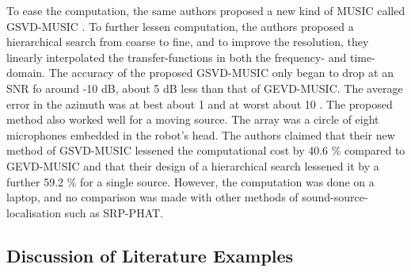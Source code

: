 \documentclass{report}
\begin{document}
To ease the computation, the same authors proposed a new kind of MUSIC called GSVD-MUSIC \cite{nakamura_real-time_2012}. To further lessen computation, the authors proposed a hierarchical search from coarse to fine, and to improve the resolution, they linearly interpolated the transfer-functions in both the frequency- and time-domain. The accuracy of the proposed GSVD-MUSIC only began to drop at an SNR fo around -10 \si{dB}, about 5 \si{dB} less than that of GEVD-MUSIC. The average error in the azimuth was at best about 1 \si{\deg} and at worst about 10 \si{\deg}. The proposed method also worked well for a moving source. The array was a circle of eight microphones embedded in the robot's head. The authors claimed that their new method of GSVD-MUSIC lessened the computational cost by 40.6 \% compared to GEVD-MUSIC and that their design of a hierarchical search lessened it by a further 59.2 \% for a single source. However, the computation was done on a laptop, and no comparison was made with other methods of sound-source-localisation such as SRP-PHAT.

\subsection{Discussion of Literature Examples}
\end{document}
